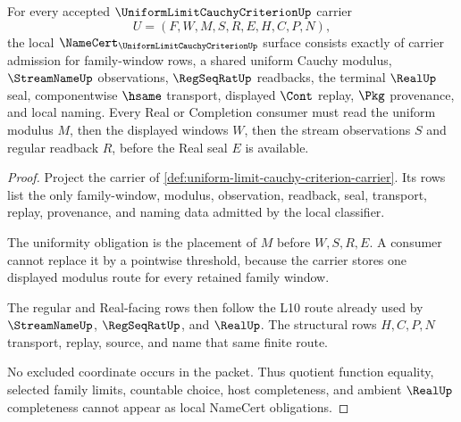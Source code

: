 \begin{theorem}
\label{thm:uniform-limit-cauchy-criterion-namecert-obligations}
For every accepted $\UniformLimitCauchyCriterionUp$ carrier
$$
U=(F,W,M,S,R,E,H,C,P,N),
$$
the local $\NameCert_{\UniformLimitCauchyCriterionUp}$ surface consists exactly of carrier admission for family-window rows, a shared uniform Cauchy modulus, $\StreamNameUp$ observations, $\RegSeqRatUp$ readbacks, the terminal $\RealUp$ seal, componentwise $\hsame$ transport, displayed $\Cont$ replay, $\Pkg$ provenance, and local naming. Every Real or Completion consumer must read the uniform modulus $M$, then the displayed windows $W$, then the stream observations $S$ and regular readback $R$, before the Real seal $E$ is available.
\end{theorem}
\begin{proof}
Project the carrier of \autoref{def:uniform-limit-cauchy-criterion-carrier}. Its rows list the only family-window, modulus, observation, readback, seal, transport, replay, provenance, and naming data admitted by the local classifier.

The uniformity obligation is the placement of $M$ before $W,S,R,E$. A consumer cannot replace it by a pointwise threshold, because the carrier stores one displayed modulus route for every retained family window.

The regular and Real-facing rows then follow the L10 route already used by $\StreamNameUp$, $\RegSeqRatUp$, and $\RealUp$. The structural rows $H,C,P,N$ transport, replay, source, and name that same finite route.

No excluded coordinate occurs in the packet. Thus quotient function equality, selected family limits, countable choice, host completeness, and ambient $\RealUp$ completeness cannot appear as local NameCert obligations.
\end{proof}

